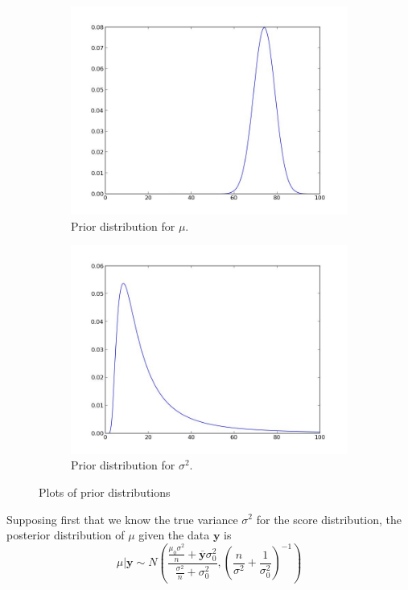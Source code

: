 \begin{figure}[h]
\centering
\begin{subfigure}[b]{.49\textwidth}
\includegraphics[width=\textwidth]{mean_prior.jpeg}
\caption{Prior distribution for $\mu$.}
\end{subfigure}
\begin{subfigure}[b]{.49\textwidth}
\includegraphics[width=\textwidth]{variance_prior.jpeg}
\caption{Prior distribution for $\sigma^{2}$.}
\end{subfigure}
\caption{Plots of prior distributions}
\end{figure}

Supposing first that we know the true variance $\sigma^{2}$ for the score distribution, the posterior distribution of $\mu$ given the data $\mathbf{y}$ is
\begin{equation*}
\mu | \mathbf{y} \sim N\left(\frac{\frac{\mu_{0}\sigma^{2}}{n} + \overline{\mathbf{y}}\sigma_{0}^{2}}{\frac{\sigma^{2}}{n} + \sigma_{0}^{2}}, \left(\frac{n}{\sigma^{2}} + \frac{1}{\sigma_{0}^{2}}\right)^{-1}\right)
\end{equation*}

